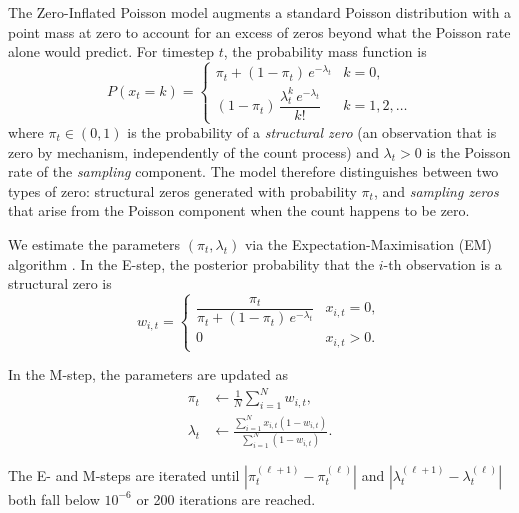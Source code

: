 \documentclass[make,article,submit,moreauthors]{Definitions/mdpi}
\begin{document}
The Zero-Inflated Poisson model \cite{ref9} augments a standard Poisson distribution with a point mass at zero to account for an excess of zeros beyond what the Poisson rate alone would predict. For timestep $t$, the probability mass function is
\begin{equation}
  P(x_t = k) =
  \begin{cases}
    \pi_t + (1 - \pi_t)\,e^{-\lambda_t} & k = 0, \\
    (1 - \pi_t)\,\dfrac{\lambda_t^k\,e^{-\lambda_t}}{k!} & k = 1, 2, \ldots
  \end{cases}
\end{equation}
where $\pi_t \in (0,1)$ is the probability of a \emph{structural zero} (an observation that is zero by mechanism, independently of the count process) and $\lambda_t > 0$ is the Poisson rate of the \emph{sampling} component. The model therefore distinguishes between two types of zero: structural zeros generated with probability $\pi_t$, and \emph{sampling zeros} that arise from the Poisson component when the count happens to be zero.

We estimate the parameters $(\pi_t, \lambda_t)$ via the Expectation-Maximisation (EM) algorithm \cite{Dempster1977}. In the E-step, the posterior probability that the $i$-th observation is a structural zero is
\begin{equation}
  w_{i,t} =
  \begin{cases}
    \dfrac{\pi_t}{\pi_t + (1 - \pi_t)\,e^{-\lambda_t}} & x_{i,t} = 0, \\
    0 & x_{i,t} > 0.
  \end{cases}
\end{equation}

In the M-step, the parameters are updated as
\begin{align}
  \pi_t &\leftarrow \frac{1}{N}\sum_{i=1}^{N} w_{i,t}, \\
  \lambda_t &\leftarrow \frac{\sum_{i=1}^{N} x_{i,t}(1 - w_{i,t})}
                            {\sum_{i=1}^{N} (1 - w_{i,t})}.
\end{align}

The E- and M-steps are iterated until $|\pi_t^{(\ell+1)} - \pi_t^{(\ell)}|$ and $|\lambda_t^{(\ell+1)} - \lambda_t^{(\ell)}|$ both fall below $10^{-6}$ or 200 iterations are reached.
\end{document}

